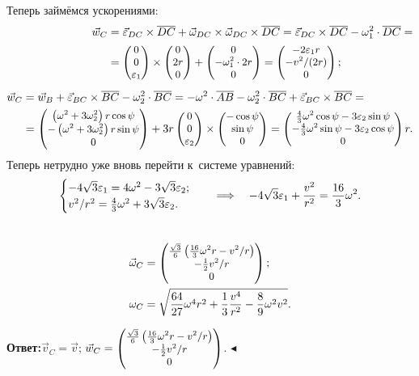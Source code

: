 \documentclass{weekly}
\begin{document}
Теперь займёмся ускорениями:
\begin{align}
\begin{split}
    \vec w_C &= \vec\varepsilon_{DC} \times \overline{DC} +
            \vec\omega_{DC} \times \vec\omega_{DC} \times \overline{DC}
        = \vec\varepsilon_{DC} \times \overline{DC} -
            \omega_1^2 \cdot \overline{DC} = \\
        &= \small\begin{pmatrix}0\\0\\\varepsilon_1\end{pmatrix} \times \small\begin{pmatrix}0\\2r\\0\end{pmatrix} +
            \small\begin{pmatrix}0\\-\omega_1^2 \cdot 2r\\0\end{pmatrix}
        = \small\begin{pmatrix}-2\varepsilon_1 r\\-v^2/(2r)\\0\end{pmatrix};
\end{split} \\[1ex]
\begin{split}
    \vec w_C &= \vec w_B + \vec\varepsilon_{BC} \times \overline{BC} -
            \omega_2^2 \cdot \overline{BC}
        = -\omega^2 \cdot \overline{AB} -
            \omega_2^2 \cdot \overline{BC} +
            \vec\varepsilon_{BC} \times \overline{BC} = \\
        &= \small\begin{pmatrix}\left(\omega^2 + 3\omega_2^2\right) r\cos\psi\\-\left(\omega^2 + 3\omega_2^2\right) r\sin\psi\\0\end{pmatrix} +
            3r \small\begin{pmatrix}0\\0\\\varepsilon_2\end{pmatrix} \times
            \small\begin{pmatrix}-\cos\psi\\\sin\psi\\0\end{pmatrix}
        = \small\begin{pmatrix}\frac{4}{3} \omega^2 \cos\psi -
                3\varepsilon_2 \sin\psi\\-\frac{4}{3} \omega^2 \sin\psi -
                3\varepsilon_2 \cos\psi\\0\end{pmatrix} r.
\end{split}
\end{align}
Теперь нетрудно уже вновь перейти к~системе уравнений:
\begin{gather}
    \begin{cases}
        -4\sqrt{3}\varepsilon_1 = 4\omega^2 -
            3\sqrt{3}\varepsilon_2; \\
        v^2/r^2 = \frac{4}{3}\omega^2 +
            3\sqrt{3}\varepsilon_2.
    \end{cases}
    \quad \Longrightarrow \quad
    -4\sqrt{3}\varepsilon_1 + \frac{v^2}{r^2} = \frac{16}{3}\omega^2.
\end{gather}\\[-5ex]
\begin{align}
    \vec\omega_C &= \small\begin{pmatrix}\frac{\sqrt{3}}{6}
        \left( \frac{16}{3}\omega^2 r - v^2/r \right)\\-\frac{1}{2} v^2/r\\0\end{pmatrix}; \\
    \omega_C &= \sqrt{\frac{64}{27} \omega^4 r^2 +
            \frac{1}{3} \frac{v^4}{r^2} - \frac{8}{9} \omega^2 v^2}.
\end{align}

\textbf{Ответ:}\quad $\vec v_C = \vec v$;\qquad
$\vec w_C = \small\begin{pmatrix}\frac{\sqrt{3}}{6}\left( \frac{16}{3}\omega^2 r - v^2/r \right)\\-\frac{1}{2} v^2/r\\0\end{pmatrix}$.
\hfill $\blacktriangleleft$
\end{document}
